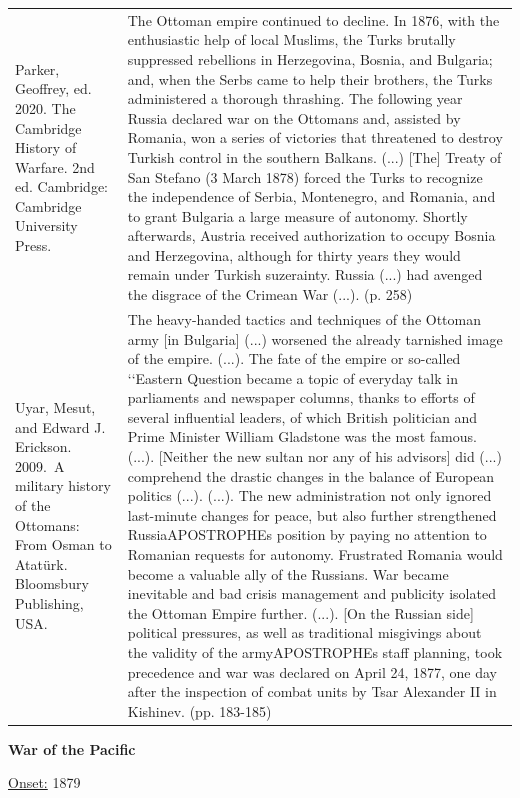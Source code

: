 {\begin{longtable}{p{}p{}}
Parker, Geoffrey, ed. 2020. The Cambridge History of Warfare. 2nd ed. Cambridge: Cambridge University Press. & The Ottoman empire continued to decline. In 1876, with the enthusiastic help of local Muslims, the Turks brutally suppressed rebellions in Herzegovina, Bosnia, and Bulgaria; and, when the Serbs came to help their brothers, the Turks administered a thorough thrashing. The following year Russia declared war on the Ottomans and, assisted by Romania, won a series of victories that threatened to destroy Turkish control in the southern Balkans. (...) [The] Treaty of San Stefano (3 March 1878) forced the Turks to recognize the independence of Serbia, Montenegro, and Romania, and to grant Bulgaria a large measure of autonomy. Shortly afterwards, Austria received authorization to occupy Bosnia and Herzegovina, although for thirty years they would remain under Turkish suzerainty. Russia (...) had avenged the disgrace of the Crimean War (...). (p. 258)
\\
Uyar, Mesut, and Edward J. Erickson. 2009. A military history of the Ottomans: From Osman to Atatürk. Bloomsbury Publishing, USA.  & The heavy-handed tactics and techniques of the Ottoman army [in Bulgaria] (...) worsened the already tarnished image of the empire. (...). The fate of the empire or so-called ‘‘Eastern Question became a topic of everyday talk in parliaments and newspaper columns, thanks to efforts of several influential leaders, of which British politician and Prime Minister William Gladstone was the most famous. (...). [Neither the new sultan nor any of his advisors] did (...) comprehend the drastic changes in the balance of European politics (...). (...). The new administration not only ignored last-minute changes for peace, but also further strengthened RussiaAPOSTROPHEs position by paying no attention to Romanian requests for autonomy. Frustrated Romania would become a valuable ally of the Russians. War became inevitable and bad crisis management and publicity isolated the Ottoman Empire further. (...).
[On the Russian side] political pressures, as well as traditional misgivings about the validity of the armyAPOSTROPHEs staff planning, took precedence and war was declared on April 24, 1877, one day after the inspection of combat units by Tsar Alexander II in Kishinev. (pp. 183-185)
\\
\end{longtable}}
\clearpage
         \textbf{War of the Pacific} 

          \underline{Onset:} 1879         

